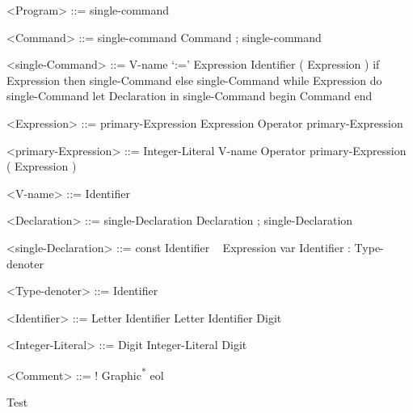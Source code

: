 \begin{Grammar}
  \begin{grammar}




<Program> ::= single-command

<Command> ::= single-command
\alt Command ; single-command

<single-Command> ::= V-name `:=' Expression
\alt Identifier ( Expression )
\alt if Expression
\alt then single-Command
\alt else single-Command
\alt while Expression do single-Command
\alt let Declaration in single-Command
\alt begin Command end

<Expression> ::= primary-Expression
\alt Expression Operator primary-Expression

<primary-Expression> ::= Integer-Literal
\alt V-name
\alt Operator primary-Expression
\alt ( Expression )

<V-name> ::= Identifier

<Declaration> ::= single-Declaration
\alt Declaration ; single-Declaration

<single-Declaration> ::= const Identifier ~ Expression
\alt var Identifier : Type-denoter

<Type-denoter> ::= Identifier

<Identifier> ::= Letter
\alt Identifier Letter
\alt Identifier Digit

<Integer-Literal> ::= Digit
\alt Integer-Literal Digit

<Comment> ::= ! Graphic\textsuperscript{*} eol

\caption{Test}
  \end{grammar}
\end{Grammar}
